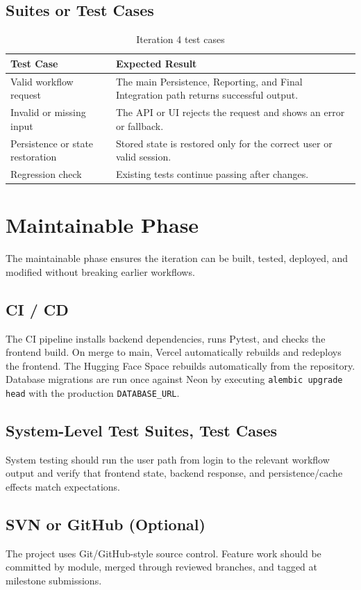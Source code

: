 \documentclass[12pt,a4paper,oneside]{report}
\newcommand{\code}[1]{\texttt{#1}}
\begin{document}
\subsection{Suites or Test Cases}
\begin{longtable}{p{}p{}}
\caption{Iteration 4 test cases}\\
\toprule
Test Case & Expected Result \\
\midrule

Valid workflow request & The main Persistence, Reporting, and Final Integration path returns successful output. \\

Invalid or missing input & The API or UI rejects the request and shows an error or fallback. \\
Persistence or state restoration & Stored state is restored only for the correct user or valid session. \\
Regression check & Existing tests continue passing after changes. \\
\bottomrule
\end{longtable}

\section{Maintainable Phase}
The maintainable phase ensures the iteration can be built, tested, deployed, and modified without breaking earlier workflows.

\subsection{CI / CD}
The CI pipeline installs backend dependencies, runs Pytest, and checks the frontend build. On merge to main, Vercel automatically rebuilds and redeploys the frontend. The Hugging Face Space rebuilds automatically from the repository. Database migrations are run once against Neon by executing \code{alembic upgrade head} with the production \code{DATABASE\_URL}.

\subsection{System-Level Test Suites, Test Cases}
System testing should run the user path from login to the relevant workflow output and verify that frontend state, backend response, and persistence/cache effects match expectations.

\subsection{SVN or GitHub (Optional)}
The project uses Git/GitHub-style source control. Feature work should be committed by module, merged through reviewed branches, and tagged at milestone submissions.
\end{document}
